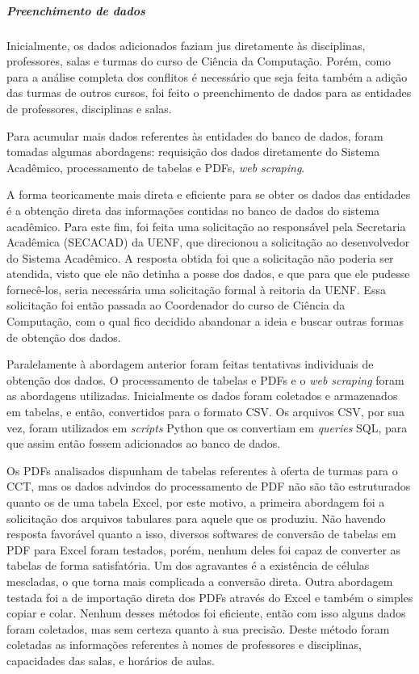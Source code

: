 \subparagraph*{Preenchimento de dados}

Inicialmente, os dados adicionados faziam jus diretamente às disciplinas, professores, salas e turmas do curso de Ciência da Computação. Porém, como para a análise completa dos conflitos é necessário que seja feita também a adição das turmas de outros cursos, foi feito o preenchimento de dados para as entidades de professores, disciplinas e salas.

Para acumular mais dados referentes às entidades do banco de dados, foram tomadas algumas abordagens: requisição dos dados diretamente do Sistema Acadêmico, processamento de tabelas e PDFs, \textit{web scraping}.

A forma teoricamente mais direta e eficiente para se obter os dados das entidades é a obtenção direta das informações contidas no banco de dados do sistema acadêmico. Para este fim, foi feita uma solicitação ao responsável pela Secretaria Acadêmica (SECACAD) da UENF, que direcionou a solicitação ao desenvolvedor do Sistema Acadêmico. A resposta obtida foi que a solicitação não poderia ser atendida, visto que ele não detinha a posse dos dados, e que para que ele pudesse fornecê-los, seria necessária uma solicitação formal à reitoria da UENF. Essa solicitação foi então passada ao Coordenador do curso de Ciência da Computação, com o qual fico decidido abandonar a ideia e buscar outras formas de obtenção dos dados.

Paralelamente à abordagem anterior foram feitas tentativas individuais de obtenção dos dados. O processamento de tabelas e PDFs e o \textit{web scraping} foram as abordagens utilizadas. Inicialmente os dados foram coletados e armazenados em tabelas, e então, convertidos para o formato CSV. Os arquivos CSV, por sua vez, foram utilizados em \textit{scripts} Python que os convertiam em \textit{queries} SQL, para que assim então fossem adicionados ao banco de dados.

Os PDFs analisados dispunham de tabelas referentes à oferta de turmas para o CCT, mas os dados advindos do processamento de PDF não são tão estruturados quanto os de uma tabela Excel, por este motivo, a primeira abordagem foi a solicitação dos arquivos tabulares para aquele que os produziu. Não havendo resposta favorável quanto a isso, diversos softwares de conversão de tabelas em PDF para Excel foram testados, porém, nenhum deles foi capaz de converter as tabelas de forma satisfatória. Um dos agravantes é a existência de células mescladas, o que torna mais complicada a conversão direta. Outra abordagem testada foi a de importação direta dos PDFs através do Excel e também o simples copiar e colar. Nenhum desses métodos foi eficiente, então com isso alguns dados foram coletados, mas sem certeza quanto à sua precisão. Deste método foram coletadas as informações referentes à nomes de professores e disciplinas, capacidades das salas, e horários de aulas.

